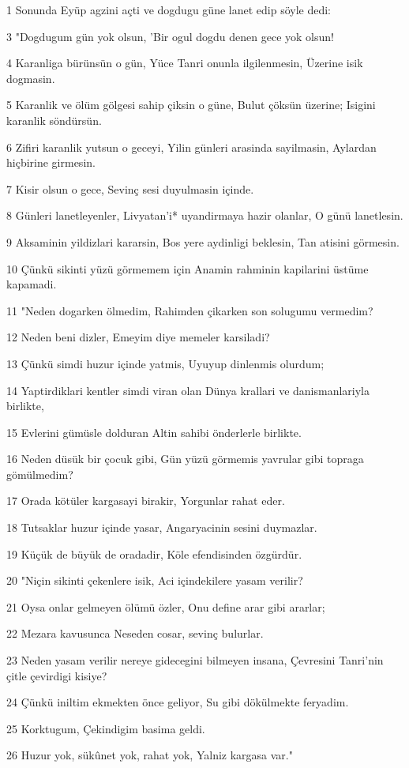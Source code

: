 \par 1 Sonunda Eyüp agzini açti ve dogdugu güne lanet edip söyle dedi:
\par 3 "Dogdugum gün yok olsun, 'Bir ogul dogdu denen gece yok olsun!
\par 4 Karanliga bürünsün o gün, Yüce Tanri onunla ilgilenmesin, Üzerine isik dogmasin.
\par 5 Karanlik ve ölüm gölgesi sahip çiksin o güne, Bulut çöksün üzerine; Isigini karanlik söndürsün.
\par 6 Zifiri karanlik yutsun o geceyi, Yilin günleri arasinda sayilmasin, Aylardan hiçbirine girmesin.
\par 7 Kisir olsun o gece, Sevinç sesi duyulmasin içinde.
\par 8 Günleri lanetleyenler, Livyatan'i* uyandirmaya hazir olanlar, O günü lanetlesin.
\par 9 Aksaminin yildizlari kararsin, Bos yere aydinligi beklesin, Tan atisini görmesin.
\par 10 Çünkü sikinti yüzü görmemem için Anamin rahminin kapilarini üstüme kapamadi.
\par 11 "Neden dogarken ölmedim, Rahimden çikarken son solugumu vermedim?
\par 12 Neden beni dizler, Emeyim diye memeler karsiladi?
\par 13 Çünkü simdi huzur içinde yatmis, Uyuyup dinlenmis olurdum;
\par 14 Yaptirdiklari kentler simdi viran olan Dünya krallari ve danismanlariyla birlikte,
\par 15 Evlerini gümüsle dolduran Altin sahibi önderlerle birlikte.
\par 16 Neden düsük bir çocuk gibi, Gün yüzü görmemis yavrular gibi topraga gömülmedim?
\par 17 Orada kötüler kargasayi birakir, Yorgunlar rahat eder.
\par 18 Tutsaklar huzur içinde yasar, Angaryacinin sesini duymazlar.
\par 19 Küçük de büyük de oradadir, Köle efendisinden özgürdür.
\par 20 "Niçin sikinti çekenlere isik, Aci içindekilere yasam verilir?
\par 21 Oysa onlar gelmeyen ölümü özler, Onu define arar gibi ararlar;
\par 22 Mezara kavusunca Neseden cosar, sevinç bulurlar.
\par 23 Neden yasam verilir nereye gidecegini bilmeyen insana, Çevresini Tanri'nin çitle çevirdigi kisiye?
\par 24 Çünkü iniltim ekmekten önce geliyor, Su gibi dökülmekte feryadim.
\par 25 Korktugum, Çekindigim basima geldi.
\par 26 Huzur yok, sükûnet yok, rahat yok, Yalniz kargasa var."

